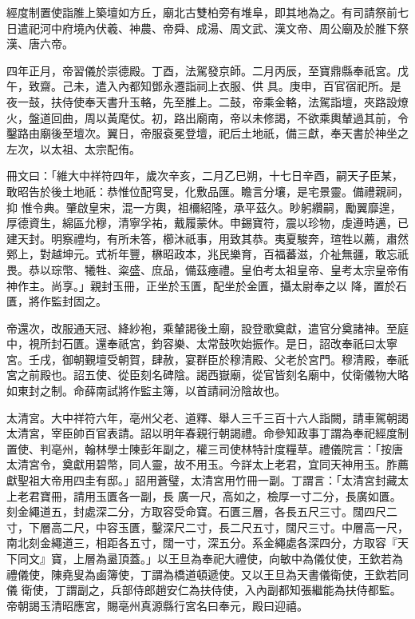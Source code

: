 \begin{pinyinscope}
 經度制置使詣脽上築壇如方丘，廟北古雙柏旁有堆阜，即其地為之。有司請祭前七日遣祀河中府境內伏羲、神農、帝舜、成湯、周文武、漢文帝、周公廟及於脽下祭漢、唐六帝。



 四年正月，帝習儀於崇德殿。丁酉，法駕發京師。二月丙辰，至寶鼎縣奉祇宮。戊午，致齋。己未，遣入內都知鄧永遷詣祠上衣服、供
 具。庚申，百官宿祀所。是夜一鼓，扶侍使奉天書升玉輅，先至脽上。二鼓，帝乘金輅，法駕詣壇，夾路設燎火，盤道回曲，周以黃麾仗。初，路出廟南，帝以未修謁，不欲乘輿輦過其前，令鑿路由廟後至壇次。翼日，帝服袞冕登壇，祀后土地祇，備三獻，奉天書於神坐之左次，以太祖、太宗配侑。



 冊文曰：「維大中祥符四年，歲次辛亥，二月乙巳朔，十七日辛酉，嗣天子臣某，敢昭告於後土地祇：恭惟位配穹旻，化敷品匯。瞻言分壤，是宅景靈。備禮親祠，抑
 惟令典。肇啟皇宋，混一方輿，祖檷紹隆，承平茲久。眇躬纘嗣，勵翼靡遑，厚德資生，綿區允穆，清寧孚祐，戴履蒙休。申錫寶符，震以珍物，虔遵時邁，已建天封。明察禮均，有所未答，櫛沐祇事，用致其恭。夷夏駿奔，瑄牲以薦，肅然鄈上，對越坤元。式祈年豐，楙昭政本，兆民樂育，百福蕃滋，介祉無疆，敢忘祇畏。恭以琮幣、犧牲、粢盛、庶品，備茲瘞禮。皇伯考太祖皇帝、皇考太宗皇帝侑神作主。尚享。」親封玉冊，正坐於玉匱，配坐於金匱，攝太尉奉之以
 降，置於石匱，將作監封固之。



 帝還次，改服通天冠、絳紗袍，乘輦謁後土廟，設登歌奠獻，遣官分奠諸神。至庭中，視所封石匱。還奉祇宮，鈞容樂、太常鼓吹始振作。是日，詔改奉祇曰太寧宮。壬戌，御朝覲壇受朝賀，肆赦，宴群臣於穆清殿、父老於宮門。穆清殿，奉祇宮之前殿也。詔五使、從臣刻名碑陰。謁西嶽廟，從官皆刻名廟中，仗衛儀物大略如東封之制。命薛南試將作監主簿，以首請祠汾陰故也。



 太清宮。大中祥符六年，亳州父老、道釋、舉人三千三百十六人詣闕，請車駕朝謁太清宮，宰臣帥百官表請。詔以明年春親行朝謁禮。命參知政事丁謂為奉祀經度制置使、判亳州，翰林學士陳彭年副之，權三司使林特計度糧草。禮儀院言：「按唐太清宮令，奠獻用碧幣，同人靈，故不用玉。今詳太上老君，宜同天神用玉。胙薦獻聖祖大帝用四圭有邸。」詔用蒼璧，太清宮用竹冊一副。丁謂言：「太清宮封藏太上老君寶冊，請用玉匱各一副，長
 廣一尺，高如之，檢厚一寸二分，長廣如匱。刻金繩道五，封處深二分，方取容受命寶。石匱三層，各長五尺三寸。闊四尺二寸，下層高二尺，中容玉匱，鑿深尺二寸，長二尺五寸，闊尺三寸。中層高一尺，南北刻金繩道三，相距各五寸，闊一寸，深五分。系金繩處各深四分，方取容『天下同文』寶，上層為盝頂蓋。」以王旦為奉祀大禮使，向敏中為儀仗使，王欽若為禮儀使，陳堯叟為鹵簿使，丁謂為橋道頓遞使。又以王旦為天書儀衛使，王欽若同儀
 衛使，丁謂副之，兵部侍郎趙安仁為扶侍使，入內副都知張繼能為扶侍都監。帝朝謁玉清昭應宮，賜亳州真源縣行宮名曰奉元，殿曰迎禧。




\end{pinyinscope}

